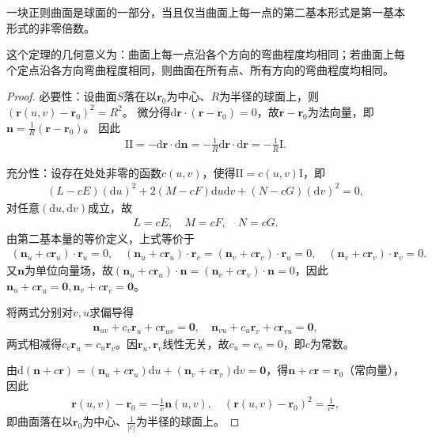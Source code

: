 \documentclass[../../main.tex]{subfiles}%
\begin{document}
\begin{theorem}
一块正则曲面是球面的一部分，当且仅当曲面上每一点的第二基本形式是第一基本形式的非零倍数。
\end{theorem}
\begin{remark}
这个定理的几何意义为：曲面上每一点沿各个方向的弯曲程度均相同；若曲面上每个定点沿各方向弯曲程度相同，则曲面在所有点、所有方向的弯曲程度均相同。
\end{remark}
\begin{proof}
必要性：设曲面$S$落在以$\boldsymbol{r}_0$为中心、$R$为半径的球面上，则$(\boldsymbol{r}(u,v)-\boldsymbol{r}_0)^2=R^2$。
微分得$\mathrm{d}\boldsymbol{r}\cdot(\boldsymbol{r}-\boldsymbol{r}_0)=0$，故$\boldsymbol{r}-\boldsymbol{r}_0$为法向量，即$\boldsymbol{n}=\frac{1}{R}(\boldsymbol{r}-\boldsymbol{r}_0)$。
因此
\begin{align*}
\mathrm{II}=-\mathrm{d}\boldsymbol{r}\cdot\mathrm{d}\boldsymbol{n}=-\frac{1}{R}\mathrm{d}\boldsymbol{r}\cdot\mathrm{d}\boldsymbol{r}=-\frac{1}{R}\mathrm{I}.
\end{align*}

充分性：设存在处处非零的函数$c(u,v)$，使得$\mathrm{II}=c(u,v)\mathrm{I}$，即
\begin{align*}
(L-cE)(\mathrm{d}u)^2+2(M-cF)\mathrm{d}u\mathrm{d}v+(N-cG)(\mathrm{d}v)^2=0,
\end{align*}
对任意$(\mathrm{d}u,\mathrm{d}v)$成立，故
\begin{align*}
L=cE,\quad M=cF,\quad N=cG.
\end{align*}
由第二基本量的等价定义，上式等价于
\begin{align*}
(\boldsymbol{n}_u+c\boldsymbol{r}_u)\cdot\boldsymbol{r}_u=0,\quad (\boldsymbol{n}_u+c\boldsymbol{r}_u)\cdot\boldsymbol{r}_v=(\boldsymbol{n}_v+c\boldsymbol{r}_v)\cdot\boldsymbol{r}_u=0,\quad (\boldsymbol{n}_v+c\boldsymbol{r}_v)\cdot\boldsymbol{r}_v=0.
\end{align*}
又$\boldsymbol{n}$为单位向量场，故$(\boldsymbol{n}_u+c\boldsymbol{r}_u)\cdot\boldsymbol{n}=(\boldsymbol{n}_v+c\boldsymbol{r}_v)\cdot\boldsymbol{n}=0$，因此$\boldsymbol{n}_u+c\boldsymbol{r}_u=\boldsymbol{0},\boldsymbol{n}_v+c\boldsymbol{r}_v=\boldsymbol{0}$。

将两式分别对$v,u$求偏导得
\begin{align*}
\boldsymbol{n}_{uv}+c_v\boldsymbol{r}_u+c\boldsymbol{r}_{uv}=\boldsymbol{0},\quad \boldsymbol{n}_{vu}+c_u\boldsymbol{r}_v+c\boldsymbol{r}_{vu}=\boldsymbol{0},
\end{align*}
两式相减得$c_v\boldsymbol{r}_u=c_u\boldsymbol{r}_v$。因$\boldsymbol{r}_u,\boldsymbol{r}_v$线性无关，故$c_u=c_v=0$，即$c$为常数。

由$\mathrm{d}(\boldsymbol{n}+c\boldsymbol{r})=(\boldsymbol{n}_u+c\boldsymbol{r}_u)\mathrm{d}u+(\boldsymbol{n}_v+c\boldsymbol{r}_v)\mathrm{d}v=\boldsymbol{0}$，得$\boldsymbol{n}+c\boldsymbol{r}=\boldsymbol{r}_0$（常向量），因此
\begin{align*}
\boldsymbol{r}(u,v)-\boldsymbol{r}_0=-\frac{1}{c}\boldsymbol{n}(u,v),\quad (\boldsymbol{r}(u,v)-\boldsymbol{r}_0)^2=\frac{1}{c^2},
\end{align*}
即曲面落在以$\boldsymbol{r}_0$为中心、$\frac{1}{|c|}$为半径的球面上。
\end{proof}
\end{document}
